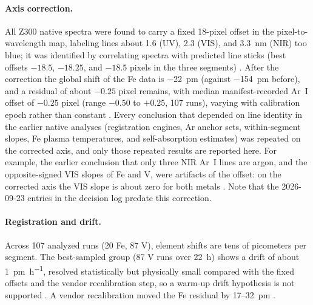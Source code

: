 \paragraph{Axis correction.}
All Z300 native spectra were found to carry a fixed 18-pixel offset in the pixel-to-wavelength map, labeling lines about 1.6 (UV), 2.3 (VIS), and \SI{3.3}{\nano\metre} (NIR) too blue; it was identified by correlating spectra with predicted line sticks (best offsets $-18.5$, $-18.25$, and $-18.5$ pixels in the three segments) %
. After the correction the global shift of the Fe data is \SI{-22}{\pico\metre} (against \SI{-154}{\pico\metre} before), and a residual of about $-0.25$ pixel remains, with median manifest-recorded Ar~I offset of $-0.25$ pixel (range $-0.50$ to $+0.25$, 107 runs), varying with calibration epoch rather than constant %
. Every conclusion that depended on line identity in the earlier native analyses (registration engines, Ar anchor sets, within-segment slopes, Fe plasma temperatures, and self-absorption estimates) was repeated on the corrected axis, and only those repeated results are reported here. For example, the earlier conclusion that only three NIR Ar~I lines are argon, and the opposite-signed VIS slopes of Fe and V, were artifacts of the offset: on the corrected axis the VIS slope is about zero for both metals %
. Note that the 2026-09-23 entries in the decision log predate this correction.

\paragraph{Registration and drift.}
Across 107 analyzed runs (20 Fe, 87 V), element shifts are tens of picometers per segment. The best-sampled group (87 V runs over 22~h) shows a drift of about \SI{1}{\pico\metre\per\hour}, resolved statistically but physically small compared with the fixed offsets and the vendor recalibration step, so a warm-up drift hypothesis is not supported %
. A vendor recalibration moved the Fe residual by 17--\SI{32}{\pico\metre} %
.

